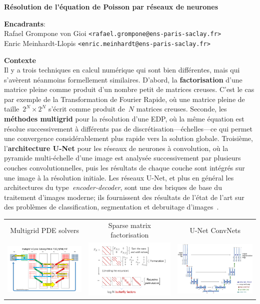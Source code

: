 \documentclass[a4paper,11pt]{article}
\begin{document}
\thispagestyle{empty}

{\bf
	Résolution de l'équation de Poisson par réseaux de neurones
}

{\bf Encadrants}:\\
Rafael Grompone von Gioi \verb+<rafael.grompone@ens-paris-saclay.fr>+\\
Enric Meinhardt-Llopis \verb+<enric.meinhardt@ens-paris-saclay.fr>+

{\bf Contexte}\\
Il y a trois techniques en calcul numérique qui sont bien différentes, mais qui
s'avèrent néanmoins formellement similaires.  D'abord, la {\bf factorisation}
d'une matrice pleine comme produit d'un nombre petit de matrices creuses.
C'est le cas par exemple de la Transformation de Fourier Rapide, où une matrice
pleine de taille~$2^N\times2^N$ s'écrit comme produit de~$N$ matrices creuses.
Seconde, les {\bf méthodes multigrid} pour la résolution d'une EDP, où la même
équation est résolue successivement à différents pas de
discrétisation---échelles---ce qui permet une convergence considérablement plus
rapide vers la solution globale.  Troisième, l'{\bf architecture U-Net} pour
les réseaux de neurones à convolution, où la pyramide multi-échelle d'une image
est analysée successivement par plusieurs couches convolutionnelles, puis les
résultats de chaque couche sont intégrés sur une image à la résolution
initiale.  Les réseaux U-Net, et plus en général les
architectures du type~\emph{encoder-decoder}, sont une des briques de base du
traitement d'images moderne; ils fournissent des résultats de l'état de l'art
sur des problèmes de classification, segmentation et debruitage
d'images~\cite{unet}.

\begin{tabular}{ccc}
	\sf\color{blue} Multigrid PDE solvers&
	\sf\color{blue} Sparse matrix factorisation &
	\sf\color{blue} U-Net ConvNets\\
	\includegraphics[width=0.3\linewidth]{f/multigrid.png} &
	\includegraphics[width=0.32\linewidth]{f/butterflies.png} &
	\includegraphics[width=0.32\linewidth]{f/cunet.png} \\
\end{tabular}
\end{document}
